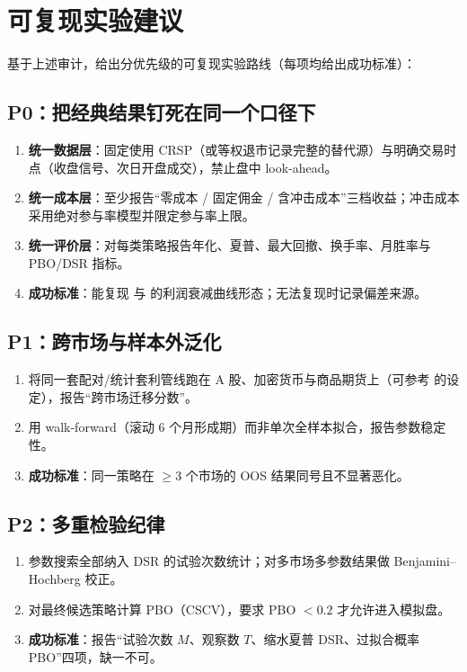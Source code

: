 \documentclass[11pt,a4paper]{ctexart}
\begin{document}
\section{可复现实验建议}\label{sec:reproduce}

基于上述审计，给出分优先级的可复现实验路线（每项均给出成功标准）：

\subsection{P0：把经典结果钉死在同一个口径下}

\begin{enumerate}
  \item \textbf{统一数据层}：固定使用 CRSP（或等权退市记录完整的替代源）与明确交易时点（收盘信号、次日开盘成交），禁止盘中 look-ahead。
  \item \textbf{统一成本层}：至少报告“零成本 / 固定佣金 / 含冲击成本”三档收益；冲击成本采用绝对参与率模型并限定参与率上限。
  \item \textbf{统一评价层}：对每类策略报告年化、夏普、最大回撤、换手率、月胜率与 PBO/DSR 指标。
  \item \textbf{成功标准}：能复现 \cite{gatev2006} 与 \cite{dofaff2012} 的利润衰减曲线形态；无法复现时记录偏差来源。
\end{enumerate}

\subsection{P1：跨市场与样本外泛化}

\begin{enumerate}
  \item 将同一套配对/统计套利管线跑在 A 股、加密货币与商品期货上（可参考 \cite{arxiv_tse,arxiv_crypto_coint,arxiv_poland_sa} 的设定），报告“跨市场迁移分数”。
  \item 用 walk-forward（滚动 6 个月形成期）而非单次全样本拟合，报告参数稳定性。
  \item \textbf{成功标准}：同一策略在 $\geq 3$ 个市场的 OOS 结果同号且不显著恶化。
\end{enumerate}

\subsection{P2：多重检验纪律}

\begin{enumerate}
  \item 参数搜索全部纳入 DSR 的试验次数统计；对多市场多参数结果做 Benjamini--Hochberg 校正。
  \item 对最终候选策略计算 PBO（CSCV），要求 PBO $<0.2$ 才允许进入模拟盘。
  \item \textbf{成功标准}：报告“试验次数 $M$、观察数 $T$、缩水夏普 DSR、过拟合概率 PBO”四项，缺一不可。
\end{enumerate}
\end{document}
